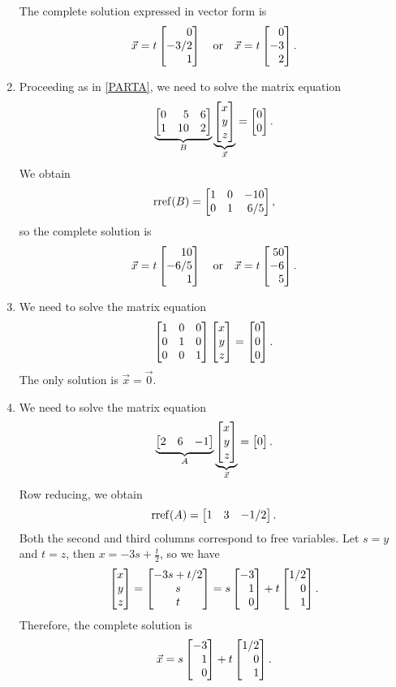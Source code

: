 \begin{exercises}
\begin{problist}
\begin{solution}
\begin{enumerate}
				The complete solution expressed in vector form is
				\[
					\vec x = t\mat{0\\-3/2\\1} \quad \text{or} \quad \vec x = t\mat{0\\-3\\2}.
				\]
				\item  Proceeding as in \ref{PARTA}, we need to solve the matrix equation
				\[
					\underbrace{\mat{0&5&6\\1&10&2} }_{B} \underbrace{\mat{x\\y\\z}}_{\vec{x}} = \mat{0\\0}.
				\]
				We obtain
				\[
					\rref (B) = \mat{1&0&-10\\0&1&6/5},
				\]
				so the complete solution is 
				\[
					\vec x = t\mat{10\\-6/5\\1} \quad \text{or} \quad \vec x = t\mat{50\\-6\\5}.
				\]


				\item We need to solve the matrix equation
				\[
					\mat{1&0&0\\0&1&0\\0&0&1} \mat{x\\y\\z} = \mat{0\\0\\0}.
				\]
				The only solution is $\vec x = \vec 0$.


				\item We need to solve the matrix equation
				\[
					\underbrace{\mat{2&6&-1} }_{A} \underbrace{\mat{x\\y\\z}}_{\vec x} = \mat{0}.
				\]
				Row reducing, we obtain
				\[
					\rref (A) = \mat{1&3&-1/2}.
				\]
				Both the second and third columns correspond to free variables. Let $s=y$ and $t=z$, then $x = -3s + \frac{t}{2}$, 
					so we have
				\[
					\mat{x\\y\\z} = \matc{-3s+t/2\\s\\t} = s\mat{-3\\1\\0} + t\mat{1/2\\0\\1}.
				\]
				Therefore, the complete solution is
				\[
					\vec x = s\mat{-3\\1\\0} + t\mat{1/2\\0\\1}.
				\]
			\end{enumerate}
		\end{solution}	


\end{problist}
\end{exercises}
